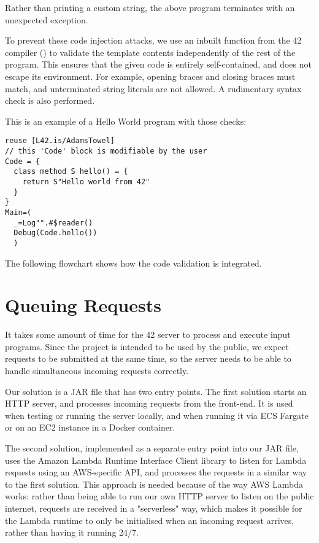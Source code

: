 Rather than printing a custom string, the above program terminates with an unexpected exception.

To prevent these code injection attacks, we use an inbuilt function from the 42 compiler () to validate the template contents independently of the rest of the program. This ensures that the given code is entirely self-contained, and does not escape its environment. For example, opening braces and closing braces must match, and unterminated string literals are not allowed. A rudimentary syntax check is also performed.

This is an example of a Hello World program with those checks:

\begin{lstlisting}[caption=Templated Hello World program]
reuse [L42.is/AdamsTowel]
// this 'Code' block is modifiable by the user
Code = {
  class method S hello() = {
    return S"Hello world from 42"
  }
}
Main=(
  _=Log"".#$reader()
  Debug(Code.hello())
  )
\end{lstlisting}

The following flowchart shows how the code validation is integrated.


\section{Queuing Requests}

It takes some amount of time for the 42 server to process and execute input programs. Since the project is intended to be used by the public, we expect requests to be submitted at the same time, so the server needs to be able to handle simultaneous incoming requests correctly.

Our solution is a JAR file that has two entry points. The first solution starts an HTTP server, and processes incoming requests from the front-end. It is used when testing or running the server locally, and when running it via ECS Fargate or on an EC2 instance in a Docker container.

The second solution, implemented as a separate entry point into our JAR file, uses the Amazon Lambda Runtime Interface Client library to listen for Lambda requests using an AWS-specific API, and processes the requests in a similar way to the first solution. This approach is needed because of the way AWS Lambda works: rather than being able to run our own HTTP server to listen on the public internet, requests are received in a "serverless" way, which makes it possible for the Lambda runtime to only be initialised when an incoming request arrives, rather than having it running 24/7.


